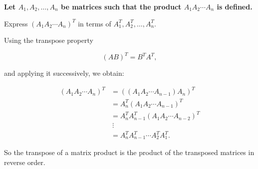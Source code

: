 
\item {\bfseries\boldmath
    Let $A_1,A_2,\ldots,A_n$ be matrices such that
    the product $A_1A_2\cdots A_n$ is defined.

    Express $(A_1A_2\cdots A_n)^T$ in terms of
    $A_1^T,A_2^T,\ldots,A_n^T$.
}

\begin{answer}
    Using the transpose property

    $$
    (AB)^T=B^TA^T,
    $$

    and applying it successively, we obtain:

    $$
    \begin{aligned}
        (A_1A_2\cdots A_n)^T
        &=\left((A_1A_2\cdots A_{n-1})A_n\right)^T\\
        &=A_n^T(A_1A_2\cdots A_{n-1})^T\\
        &=A_n^TA_{n-1}^T
          (A_1A_2\cdots A_{n-2})^T\\
        &\ \vdots\\
        &=\boxed{A_n^TA_{n-1}^T\cdots A_2^TA_1^T}.
    \end{aligned}
    $$

    So the transpose of a matrix product is the product of the transposed matrices in reverse order.
\end{answer}
